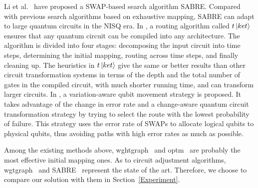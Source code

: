 \documentclass[journal]{IEEEtran}
\begin{document}
\begin{itemize}
Li et al.~\cite{Li2018} have proposed a SWAP-based search algorithm SABRE. Compared with previous search algorithms based on exhaustive mapping, SABRE
can adapt to large quantum circuits in the NISQ era. In \cite{Cowtan2019}, a routing algorithm called $t\left\vert{ket}\right\rangle$  ensures that any quantum circuit can be compiled into any architecture. The algorithm is divided into four stages: decomposing the input circuit into time steps, determining the initial mapping, routing across time steps, and finally cleaning up. The heuristics in $t\left\vert{ket}\right\rangle$ give the same or better results than other circuit transformation systems in terms of the depth and the total number of gates in the compiled circuit, with much shorter running time, and can transform larger circuits. In \cite{Tannu2019},  a variation-aware qubit movement strategy is proposed. It takes advantage of the change in error rate and a change-aware quantum circuit transformation strategy by trying to select the route with the lowest probability of failure. This strategy uses the error rate of  SWAPs to allocate logical qubits to physical qubits, thus avoiding paths with high error rates as much as possible.
\end{itemize}

Among the existing methods above, wghtgraph~\cite{2020Qubit} and optm~\cite{Zulehner2017} are probably the most effective initial mapping ones. As to circuit adjustment algorithms, wgtgraph~\cite{2020Qubit} and SABRE~\cite{Li2018} represent the state of the art. Therefore, we choose to compare our solution with them in Section~\ref{Experiment}.
\end{document}
